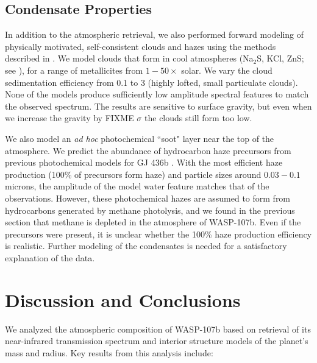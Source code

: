 \documentclass[twocolumn]{aastex61}
\begin{document}
\subsection{Condensate Properties}
In addition to the atmospheric retrieval, we also performed forward modeling of physically motivated, self-consistent clouds and hazes using the methods described in \cite{fortney08, morley15}.  We model clouds that form in cool atmospheres (Na$_2$S, KCl, ZnS; see \citealt{morley12}), for a range of metallicites from $1-50\times$ solar. We vary the cloud sedimentation efficiency from 0.1 to 3 (highly lofted, small particulate clouds). None of the models produce sufficiently low amplitude spectral features to match the observed spectrum. The results are sensitive to surface gravity, but even when we increase the gravity by FIXME $\sigma$ the clouds still form too low.

We also model an \emph{ad hoc} photochemical ``soot" layer near the top of the atmosphere. We predict the abundance of hydrocarbon haze precursors from previous photochemical models for GJ 436b \citep{line11, morley17}. With the most efficient haze production (100\% of precursors form haze) and particle sizes around $0.03-0.1$ microns, the amplitude of the model water feature matches that of the observations. However, these photochemical hazes are assumed to form from hydrocarbons generated by methane photolysis, and we found in the previous section that methane is depleted in the atmosphere of WASP-107b.  Even if the precursors were present, it is unclear whether the 100\% haze production efficiency is realistic. Further modeling of the condensates is needed for a satisfactory explanation of the data.

\section{Discussion and Conclusions} \label{sec:discuss}
We analyzed the atmospheric composition of WASP-107b based on retrieval of its near-infrared transmission spectrum and interior structure models of the planet's mass and radius.  Key results from this analysis include:
\end{document}
